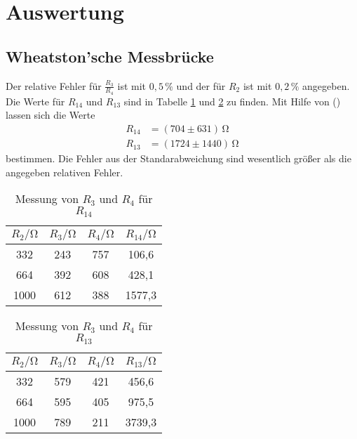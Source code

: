 \section{Auswertung}
\label{sec:Auswertung}

\subsection{Wheatston'sche Messbrücke}
Der relative Fehler für $\frac{R_3}{R_4}$ ist mit $0,5\,\%$ und der für $R_2$ ist mit $0,2\,\%$ angegeben. Die Werte für $R_{14}$ und $R_{13}$ sind in
Tabelle \ref{tab:R14} und \ref{tab:R13} zu finden. Mit Hilfe von () lassen sich die Werte
\begin{align*}
  R_{14} &= (704 \pm 631)\,\unit{\ohm} \\
  R_{13} &= (1724 \pm 1440)\,\unit{\ohm}
\end{align*}
bestimmen. Die Fehler aus der Standarabweichung sind wesentlich größer als die angegeben relativen Fehler.

\begin{table}
  \centering
  \caption{Messung von $R_3$ und $R_4$ für $R_{14}$}
  \label{tab:R14}
  \begin{tabular}{c c c c}
    \toprule
    $R_2/\unit{\ohm}$ & $R_3/\unit{\ohm}$ & $R_4/\unit{\ohm}$ & $R_{14}/\unit{\ohm}$ \\
    \midrule
     332 & 243 & 757 &  106,6 \\
     664 & 392 & 608 &  428,1 \\
    1000 & 612 & 388 & 1577,3 \\
    \bottomrule
  \end{tabular}
\end{table}

\begin{table}
  \centering
  \caption{Messung von $R_3$ und $R_4$ für $R_{13}$}
  \label{tab:R13}
  \begin{tabular}{c c c c}
    \toprule
    $R_2/\unit{\ohm}$ & $R_3/\unit{\ohm}$ & $R_4/\unit{\ohm}$ & $R_{13}/\unit{\ohm}$ \\
    \midrule
     332 & 579 & 421 &  456,6 \\
     664 & 595 & 405 &  975,5 \\
    1000 & 789 & 211 & 3739,3 \\
    \bottomrule
  \end{tabular}
\end{table}

